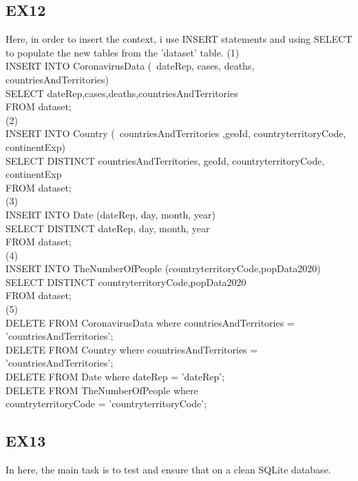 \documentclass[]{article}
\begin{document}
\begin{titlepage}
		    \subsection{EX12}
		    Here, in order to insert the context, i use INSERT statements and using SELECT to populate the new tables from the 'dataset' table.
		   \newpage
		    (1)\\INSERT INTO CoronavirusData (\ dateRep, cases, deaths, countriesAndTerritories)\\
		    SELECT dateRep,cases,deaths,countriesAndTerritories\\
		    FROM dataset;\\
		    
		    (2)\\INSERT INTO Country (\ countriesAndTerritories ,geoId, countryterritoryCode, continentExp)\\
		    SELECT DISTINCT countriesAndTerritories, geoId, countryterritoryCode, continentExp\\
		    FROM dataset;\\
		    
		    (3)\\INSERT INTO Date (dateRep, day, month, year)\\
		    SELECT DISTINCT dateRep, day, month, year\\
		    FROM dataset;\\
		    
		    (4)\\INSERT INTO TheNumberOfPeople (countryterritoryCode,popData2020)\\
		    SELECT DISTINCT countryterritoryCode,popData2020\\
		    FROM dataset;\\
		    
		    (5)\\DELETE FROM CoronavirusData where countriesAndTerritories = 'countriesAndTerritories';\\
		    DELETE FROM Country where  countriesAndTerritories = 'countriesAndTerritories';\\
		    DELETE FROM Date where  dateRep = 'dateRep';\\
		    DELETE FROM TheNumberOfPeople where\\ countryterritoryCode = 'countryterritoryCode';
		    \subsection{EX13}
		    In here, the main task is to test and ensure that on a clean SQLite database.

\end{titlepage}
\end{document}
